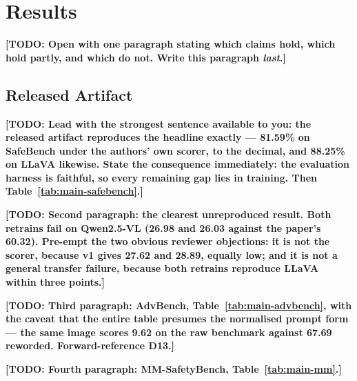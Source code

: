 \documentclass[10pt]{article} %
\newcommand{\todo}[1]{\textbf{[TODO: #1]}}
\begin{document}
\section{Results}
\label{sec:results}

\todo{Open with one paragraph stating which claims hold, which hold partly, and which do not. Write this paragraph \emph{last}.}

\subsection{Released Artifact}
\label{sec:results-artifact}

\todo{Lead with the strongest sentence available to you: the released artifact reproduces the headline exactly --- 81.59\% on SafeBench under the authors' own scorer, to the decimal, and 88.25\% on LLaVA likewise. State the consequence immediately: the evaluation harness is faithful, so every remaining gap lies in training. Then Table~\ref{tab:main-safebench}.}

\todo{Second paragraph: the clearest unreproduced result. Both retrains fail on Qwen2.5-VL (26.98 and 26.03 against the paper's 60.32). Pre-empt the two obvious reviewer objections: it is not the scorer, because v1 gives 27.62 and 28.89, equally low; and it is not a general transfer failure, because both retrains reproduce LLaVA within three points.}

\todo{Third paragraph: AdvBench, Table~\ref{tab:main-advbench}, with the caveat that the entire table presumes the normalised prompt form --- the same image scores 9.62 on the raw benchmark against 67.69 reworded. Forward-reference D13.}

\todo{Fourth paragraph: MM-SafetyBench, Table~\ref{tab:main-mm}.}
\end{document}
